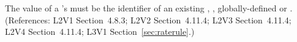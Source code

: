 The value of a \RateRule's  must be the identifier
of an existing \Compartment, \Species, globally-defined \Parameter
or \SpeciesReference.
(References: L2V1 Section~4.8.3; L2V2 Section~4.11.4; L2V3
Section~4.11.4; L2V4 Section~4.11.4; L3V1 Section~\ref{sec:raterule}.)
